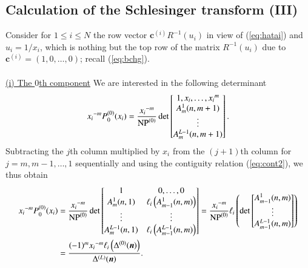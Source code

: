 \documentclass[12pt]{article}
\numberwithin{equation}{section}
\begin{document}
\subsection{Calculation of the Schlesinger transform (III)}
\label{subsect:cal3}

Consider
for $1 \leq i \leq N$
 the row vector
${\boldsymbol c}^{(i)} R^{-1}(u_i)$
in view of (\ref{eq:hatai}) and $u_i=1/x_i$,
which is nothing but 
the top row of the matrix 
$R^{-1}(u_i)$
due to
${\boldsymbol c}^{(i)}= (1,0,\ldots,0) $;
recall (\ref{eq:bchg}).



\paragraph{}
\underline{(i) The $0$th component}
\quad 
We are interested in the following determinant
\[
{x_i}^{-m}
P_0^{(0)}(x_i)
=
\frac{ {x_i}^{-m} }{ {\rm NP}^{(0)} }
\det 
\begin{bmatrix}
1,x_i, \ldots, {x_i}^m
\\
A^1_{m}(n,m+1) 
\\
\vdots
\\
A^{L-1}_{m}(n,m+1) 
\end{bmatrix}.
\]
Subtracting the $j$th column 
multiplied by $x_i$
from the $(j+1)$th column for 
$j=m,m-1,\ldots,1$ sequentially 
and using  the contiguity relation (\ref{eq:cont2}),
we thus obtain
\begin{align}
{x_i}^{-m}
P_0^{(0)}(x_i)
&=
\frac{ {x_i}^{-m} }{ {\rm NP}^{(0)} }
\det 
\begin{bmatrix}
1 &0, \ldots, 0
\\
A_m^1(n,1)&\ell_i \left( A^1_{m-1}(n,m) \right)
\\
\vdots&\vdots
\\
A_m^{L-1}(n,1)&\ell_i \left(A^{L-1}_{m-1}(n,m) \right)
\end{bmatrix}
=
\frac{ {x_i}^{-m} }{ {\rm NP}^{(0)} }
\ell_i 
\left(
\det 
\begin{bmatrix}
 A^1_{m-1}(n,m) 
\\
\vdots
\\
 A^{L-1}_{m-1}(n,m) 
\end{bmatrix}
\right)
\nonumber
\\
&=
\frac{(-1)^m {x_i}^{-m}  
\ell_i
\left(
\Delta^{(0)}({\boldsymbol n}) \right)}{ \Delta^{(L)}({\boldsymbol n}) }.
\label{eq:p0x}
\end{align}
\end{document}
